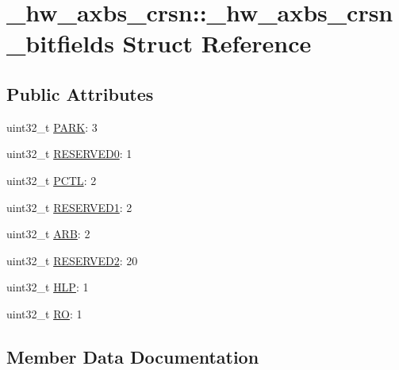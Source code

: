 \hypertarget{struct__hw__axbs__crsn_1_1__hw__axbs__crsn__bitfields}{}\section{\+\_\+hw\+\_\+axbs\+\_\+crsn\+:\+:\+\_\+hw\+\_\+axbs\+\_\+crsn\+\_\+bitfields Struct Reference}
\label{struct__hw__axbs__crsn_1_1__hw__axbs__crsn__bitfields}
\subsection*{Public Attributes}
\begin{DoxyCompactItemize}
\item 
uint32\+\_\+t \hyperlink{struct__hw__axbs__crsn_1_1__hw__axbs__crsn__bitfields_a5e216805872d190cfa6a6a2aa27812c2}{P\+A\+RK}\+: 3
\item 
uint32\+\_\+t \hyperlink{struct__hw__axbs__crsn_1_1__hw__axbs__crsn__bitfields_a67e86646ae978a901ecabc32fbd85c2e}{R\+E\+S\+E\+R\+V\+E\+D0}\+: 1
\item 
uint32\+\_\+t \hyperlink{struct__hw__axbs__crsn_1_1__hw__axbs__crsn__bitfields_aff79c585a318ca2a065bcbd2f6c8998e}{P\+C\+TL}\+: 2
\item 
uint32\+\_\+t \hyperlink{struct__hw__axbs__crsn_1_1__hw__axbs__crsn__bitfields_af13ae623487329b644d9c4131805d6f7}{R\+E\+S\+E\+R\+V\+E\+D1}\+: 2
\item 
uint32\+\_\+t \hyperlink{struct__hw__axbs__crsn_1_1__hw__axbs__crsn__bitfields_a196120afe1e29d50cc2eba842609e195}{A\+RB}\+: 2
\item 
uint32\+\_\+t \hyperlink{struct__hw__axbs__crsn_1_1__hw__axbs__crsn__bitfields_ab54cfd57fc77477f37f27ca82cb3a0d3}{R\+E\+S\+E\+R\+V\+E\+D2}\+: 20
\item 
uint32\+\_\+t \hyperlink{struct__hw__axbs__crsn_1_1__hw__axbs__crsn__bitfields_a3ea42fdec26502855fc04f7f4a281174}{H\+LP}\+: 1
\item 
uint32\+\_\+t \hyperlink{struct__hw__axbs__crsn_1_1__hw__axbs__crsn__bitfields_acce040240dfba45774eef414c23adb99}{RO}\+: 1
\end{DoxyCompactItemize}


\subsection{Member Data Documentation}

